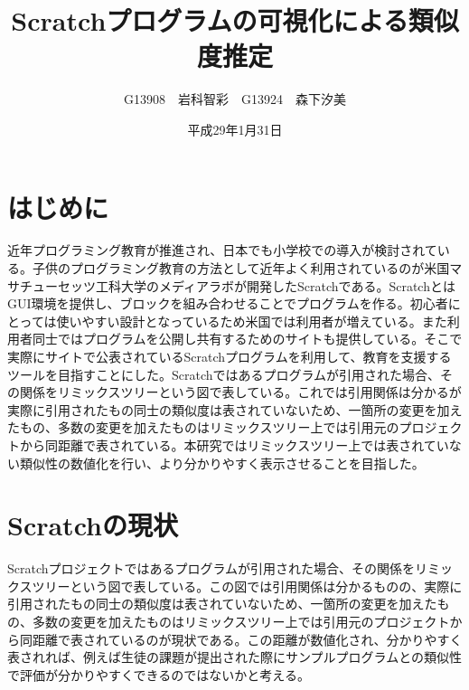 \documentclass[twocolumn,9pt,a4paper]{jsarticle}
\title{Scratchプログラムの可視化による類似度推定}
\author{G13908　岩科智彩　G13924　森下汐美}
\date{平成29年1月31日}
\begin{document}
\maketitle
%
%
\section{はじめに}
近年プログラミング教育が推進され、日本でも小学校での導入が検討されている。子供のプログラミング教育の方法として近年よく利用されているのが米国マサチューセッツ工科大学のメディアラボが開発したScratchである。ScratchとはGUI環境を提供し、ブロックを組み合わせることでプログラムを作る。初心者にとっては使いやすい設計となっているため米国では利用者が増えている。また利用者同士ではプログラムを公開し共有するためのサイトも提供している。そこで実際にサイトで公表されているScratchプログラムを利用して、教育を支援するツールを目指すことにした。Scratchではあるプログラムが引用された場合、その関係をリミックスツリーという図で表している。これでは引用関係は分かるが実際に引用されたもの同士の類似度は表されていないため、一箇所の変更を加えたもの、多数の変更を加えたものはリミックスツリー上では引用元のプロジェクトから同距離で表されている。本研究ではリミックスツリー上では表されていない類似性の数値化を行い、より分かりやすく表示させることを目指した。

\section{Scratchの現状}
Scratchプロジェクトではあるプログラムが引用された場合、その関係をリミックスツリーという図で表している。この図では引用関係は分かるものの、実際に引用されたもの同士の類似度は表されていないため、一箇所の変更を加えたもの、多数の変更を加えたものはリミックスツリー上では引用元のプロジェクトから同距離で表されているのが現状である。この距離が数値化され、分かりやすく表されれば、例えば生徒の課題が提出された際にサンプルプログラムとの類似性で評価が分かりやすくできるのではないかと考える。
\end{document}
